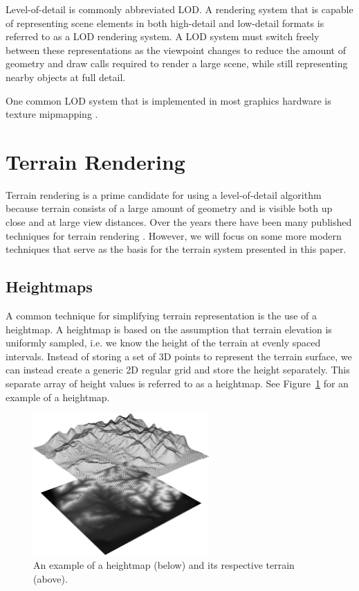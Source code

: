 Level-of-detail is commonly abbreviated LOD.
A rendering system that is capable of representing scene elements in both high-detail and low-detail formats is referred to as a LOD rendering system.
A LOD system must switch freely between these representations as the viewpoint changes to reduce the amount of geometry and draw calls required to render a large scene, while still representing nearby objects at full detail.

One common LOD system that is implemented in most graphics hardware is texture mipmapping \cite{opengl_mipmaps}.


\section{Terrain Rendering} \label{terrain_render}

Terrain rendering is a prime candidate for using a level-of-detail algorithm because terrain consists of a large amount of geometry and is visible both up close and at large view distances.
Over the years there have been many published techniques for terrain rendering
\cite{hardware_lod}
\cite{roambetter}
\cite{bruneton_terrain}
\cite{p-bdam}
\cite{righttri}
\cite{diamondterrain}
\cite{roam}
\cite{clod}.
However, we will focus on some more modern techniques that serve as the basis for the terrain system presented in this paper.


\subsection{Heightmaps}

A common technique for simplifying terrain representation is the use of a heightmap.
A heightmap is based on the assumption that terrain elevation is uniformly sampled, i.e. we know the height of the terrain at evenly spaced intervals.
Instead of storing a set of 3D points to represent the terrain surface, we can instead create a generic 2D regular grid and store the height separately.
This separate array of height values is referred to as a heightmap.
See Figure~\ref{fig:hm} for an example of a heightmap.

\begin{figure}
	\centering
		\includegraphics[width=0.6\textwidth]{figures/hm1.png}
	\caption{An example of a heightmap (below) and its respective terrain (above).}
	\label{fig:hm}
\end{figure}

